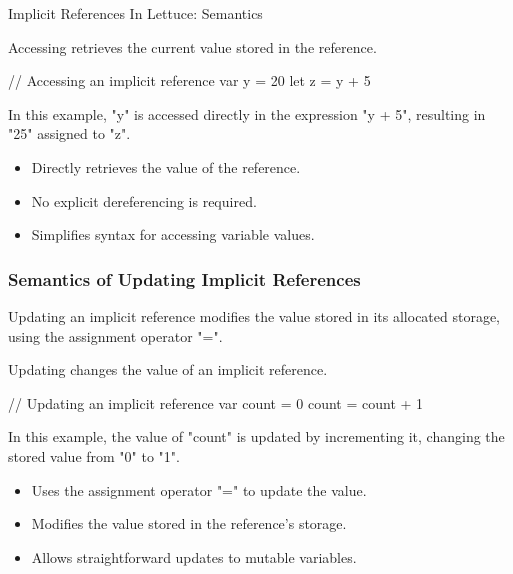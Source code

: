\begin{notes}{Implicit References In Lettuce: Semantics}
    \begin{highlight}
    
        Accessing retrieves the current value stored in the reference.
    
    \begin{code}[Lettuce]
    // Accessing an implicit reference
    var y = 20
    let z = y + 5
    \end{code}
    
        In this example, "y" is accessed directly in the expression "y + 5", resulting in "25" assigned to "z".
    
        \begin{itemize}
            \item Directly retrieves the value of the reference.
            \item No explicit dereferencing is required.
            \item Simplifies syntax for accessing variable values.
        \end{itemize}
    
    \end{highlight}
    
    \subsubsection*{Semantics of Updating Implicit References}
    
    Updating an implicit reference modifies the value stored in its allocated storage, using the assignment operator "=".
    
    \begin{highlight}
    
        Updating changes the value of an implicit reference.
    
    \begin{code}[Lettuce]
    // Updating an implicit reference
    var count = 0
    count = count + 1
    \end{code}
    
        In this example, the value of "count" is updated by incrementing it, changing the stored value from "0" to "1".
    
        \begin{itemize}
            \item Uses the assignment operator "=" to update the value.
            \item Modifies the value stored in the reference's storage.
            \item Allows straightforward updates to mutable variables.
        \end{itemize}
    

\end{highlight}
\end{notes}
